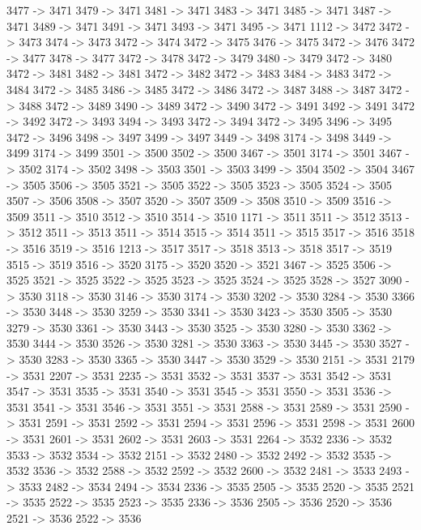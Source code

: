 {	3477 -> 3471
	3479 -> 3471
	3481 -> 3471
	3483 -> 3471
	3485 -> 3471
	3487 -> 3471
	3489 -> 3471
	3491 -> 3471
	3493 -> 3471
	3495 -> 3471
	1112 -> 3472
	3472 -> 3473
	3474 -> 3473
	3472 -> 3474
	3472 -> 3475
	3476 -> 3475
	3472 -> 3476
	3472 -> 3477
	3478 -> 3477
	3472 -> 3478
	3472 -> 3479
	3480 -> 3479
	3472 -> 3480
	3472 -> 3481
	3482 -> 3481
	3472 -> 3482
	3472 -> 3483
	3484 -> 3483
	3472 -> 3484
	3472 -> 3485
	3486 -> 3485
	3472 -> 3486
	3472 -> 3487
	3488 -> 3487
	3472 -> 3488
	3472 -> 3489
	3490 -> 3489
	3472 -> 3490
	3472 -> 3491
	3492 -> 3491
	3472 -> 3492
	3472 -> 3493
	3494 -> 3493
	3472 -> 3494
	3472 -> 3495
	3496 -> 3495
	3472 -> 3496
	3498 -> 3497
	3499 -> 3497
	3449 -> 3498
	3174 -> 3498
	3449 -> 3499
	3174 -> 3499
	3501 -> 3500
	3502 -> 3500
	3467 -> 3501
	3174 -> 3501
	3467 -> 3502
	3174 -> 3502
	3498 -> 3503
	3501 -> 3503
	3499 -> 3504
	3502 -> 3504
	3467 -> 3505
	3506 -> 3505
	3521 -> 3505
	3522 -> 3505
	3523 -> 3505
	3524 -> 3505
	3507 -> 3506
	3508 -> 3507
	3520 -> 3507
	3509 -> 3508
	3510 -> 3509
	3516 -> 3509
	3511 -> 3510
	3512 -> 3510
	3514 -> 3510
	1171 -> 3511
	3511 -> 3512
	3513 -> 3512
	3511 -> 3513
	3511 -> 3514
	3515 -> 3514
	3511 -> 3515
	3517 -> 3516
	3518 -> 3516
	3519 -> 3516
	1213 -> 3517
	3517 -> 3518
	3513 -> 3518
	3517 -> 3519
	3515 -> 3519
	3516 -> 3520
	3175 -> 3520
	3520 -> 3521
	3467 -> 3525
	3506 -> 3525
	3521 -> 3525
	3522 -> 3525
	3523 -> 3525
	3524 -> 3525
	3528 -> 3527
	3090 -> 3530
	3118 -> 3530
	3146 -> 3530
	3174 -> 3530
	3202 -> 3530
	3284 -> 3530
	3366 -> 3530
	3448 -> 3530
	3259 -> 3530
	3341 -> 3530
	3423 -> 3530
	3505 -> 3530
	3279 -> 3530
	3361 -> 3530
	3443 -> 3530
	3525 -> 3530
	3280 -> 3530
	3362 -> 3530
	3444 -> 3530
	3526 -> 3530
	3281 -> 3530
	3363 -> 3530
	3445 -> 3530
	3527 -> 3530
	3283 -> 3530
	3365 -> 3530
	3447 -> 3530
	3529 -> 3530
	2151 -> 3531
	2179 -> 3531
	2207 -> 3531
	2235 -> 3531
	3532 -> 3531
	3537 -> 3531
	3542 -> 3531
	3547 -> 3531
	3535 -> 3531
	3540 -> 3531
	3545 -> 3531
	3550 -> 3531
	3536 -> 3531
	3541 -> 3531
	3546 -> 3531
	3551 -> 3531
	2588 -> 3531
	2589 -> 3531
	2590 -> 3531
	2591 -> 3531
	2592 -> 3531
	2594 -> 3531
	2596 -> 3531
	2598 -> 3531
	2600 -> 3531
	2601 -> 3531
	2602 -> 3531
	2603 -> 3531
	2264 -> 3532
	2336 -> 3532
	3533 -> 3532
	3534 -> 3532
	2151 -> 3532
	2480 -> 3532
	2492 -> 3532
	3535 -> 3532
	3536 -> 3532
	2588 -> 3532
	2592 -> 3532
	2600 -> 3532
	2481 -> 3533
	2493 -> 3533
	2482 -> 3534
	2494 -> 3534
	2336 -> 3535
	2505 -> 3535
	2520 -> 3535
	2521 -> 3535
	2522 -> 3535
	2523 -> 3535
	2336 -> 3536
	2505 -> 3536
	2520 -> 3536
	2521 -> 3536
	2522 -> 3536
}
